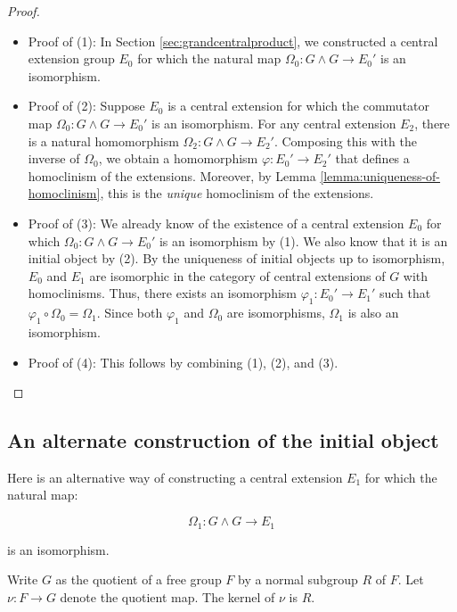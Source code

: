 \documentclass{ucetd}
\begin{document}
\begin{proof}
  \begin{itemize}
  \item Proof of (1): In Section \ref{sec:grandcentralproduct}, we
    constructed a central extension group $E_0$ for which the natural
    map $\Omega_0: G \wedge G \to E_0'$ is an isomorphism.

  \item Proof of (2): Suppose $E_0$ is a central extension for which
    the commutator map $\Omega_0:G \wedge G \to E_0'$ is an
    isomorphism. For any central extension $E_2$, there is a natural
    homomorphism $\Omega_2: G \wedge G \to E_2'$. Composing this with
    the inverse of $\Omega_0$, we obtain a homomorphism
    $\varphi:E_0' \to E_2'$ that defines a homoclinism of the
    extensions. Moreover, by Lemma
    \ref{lemma:uniqueness-of-homoclinism}, this is the {\em unique}
    homoclinism of the extensions.

  \item Proof of (3): We already know of the existence of a central
    extension $E_0$ for which $\Omega_0:G \wedge G \to E_0'$ is
    an isomorphism by (1). We also know that it is an initial object
    by (2). By the uniqueness of initial objects up to isomorphism,
    $E_0$ and $E_1$ are isomorphic in the category of central
    extensions of $G$ with homoclinisms. Thus, there exists an
    isomorphism $\varphi_1:E_0' \to E_1'$ such that $\varphi_1 \circ
    \Omega_0 = \Omega_1$. Since both $\varphi_1$ and $\Omega_0$ are
    isomorphisms, $\Omega_1$ is also an isomorphism.

  \item Proof of (4): This follows by combining (1), (2), and (3).
  \end{itemize}
\end{proof}

\subsection{An alternate construction of the initial object}\label{sec:freeinitialobject}

Here is an alternative way of constructing a central extension $E_1$ for which the natural map:

$$\Omega_1:G \wedge G \to E_1$$

is an isomorphism.

Write $G$ as the quotient of a free group $F$ by a normal subgroup $R$
of $F$. Let $\nu:F \to G$ denote the quotient map. The kernel of $\nu$
is $R$.
\end{document}
